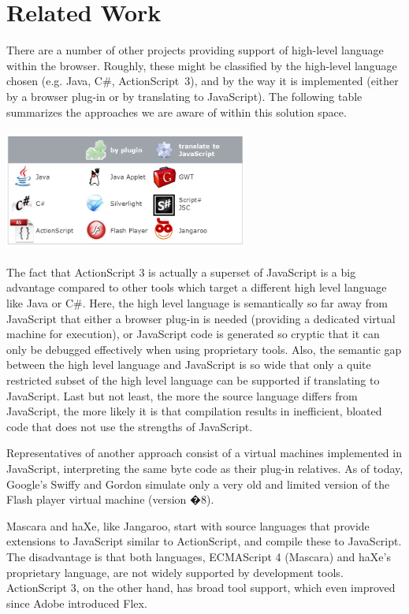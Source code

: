 \documentclass[10pt]{sigplanconf}
\begin{document}
\section{Related Work}

There are a number of other projects providing support of high-level language within the browser. Roughly, these might be classified by the high-level language chosen (e.g. Java, C\#, ActionScript\ 3), and by the way it is implemented (either by a browser plug-in or by translating to JavaScript). The following table summarizes the approaches we are aware of within this solution space.

\vspace{20pt}
\includegraphics[width=80mm,height=40mm]{TechnologyMatrix}
\vspace{20pt}

The fact that ActionScript 3 is actually a superset of JavaScript is a big advantage compared to other tools which target a different high level language like Java or C\#. Here, the high level language is semantically so far away from JavaScript that either a browser plug-in is needed (providing a dedicated virtual machine for execution), or JavaScript code is generated so cryptic that it can only be debugged effectively when using proprietary tools. Also, the semantic gap between the high level language and JavaScript is so wide that only a quite restricted subset of the high level language can be supported if translating to JavaScript. Last but not least, the more the source language differs from JavaScript, the more likely it is that compilation results in inefficient, bloated code that does not use the strengths of JavaScript.

Representatives of another approach consist of a virtual machines implemented in JavaScript, interpreting the same byte code as their plug-in relatives. As of today, Google's Swiffy\citep{swiffy} and Gordon\citep{gordon} simulate only a very old and limited version of the Flash player virtual machine (version �8). 

Mascara\citep{mascara} and haXe\citep{haxe}, like Jangaroo, start with source languages that provide extensions to JavaScript similar to ActionScript, and compile these to Java\-Script. The disadvantage is that both languages,  ECMAScript 4 (Mascara) and haXe's proprietary language, are not widely supported by development tools. ActionScript 3, on the other hand, has broad tool support, which even improved since Adobe introduced Flex\citep{flex}. 
\end{document}
